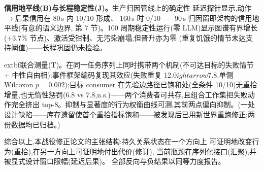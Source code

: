 \textbf{信用地平线(B)与长程稳定性(J)。}生产归因管线上的确定性
延迟探针显示,动作$\rightarrow$后果信用在 80\,s 内 10/10 形成、
160\,s 时 0/10——90\,s 归因窗即架构的信用地平线(有意的语义边界,
第 7 节)。100 周期稳定性运行(零 LLM)显示图谱有界增长
($+3.7\%$ 节点)、激活受钳制、无污染崩塌,但晋升亦为零
(重复饥饿的情节未达支持阈值)——长程巩固仍未检验。

	extbf{联合测量(T)。}在同一任务序列上同时携带两个机制(不可达目标的失败情节 + 中性自由相):事件框架编码复现其效应(失败重复 12.0$
ightarrow$7.8,单侧 Wilcoxon $p{=}0.002$);目标 consumer 在先验边路径已饱和处(全条件 10/10)无重拾增量,也无惰性惩罚(6.8 vs 7.8,n.s.)——两个消费者可共存,且组合工作集把失败动作完全挤出 top-8。抑制与显著度的行为权衡曲线可测,其前两点偏向抑制。(一处设计缺陷——库存遗留使首个重拾指标饱和——被发现后已用新世界重跑修正;两份数据均已归档。)

综合以上,本战役修正论文的主张结构:持久关系状态在一个方向上
可证明地改变行为(重拾),在另一方向上可证明地付出代价(修订),
当前瓶颈在序列化接口(汇聚),并被显式设计窗口限幅(延迟后果)。
全部反向与负结果以同等力度报告。
